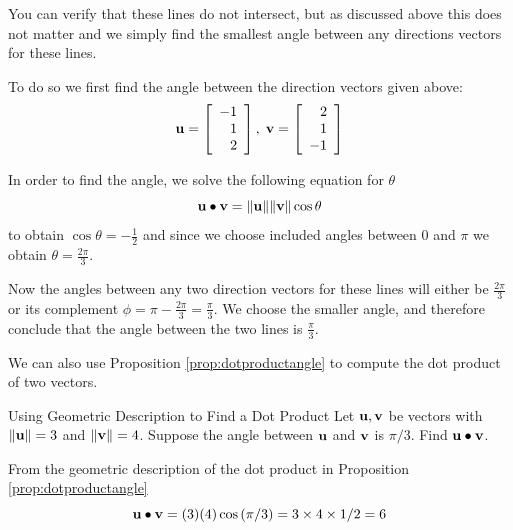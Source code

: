\begin{solution}
You can verify that these lines do not intersect, but as discussed
above this does not matter and we simply find the smallest angle
between any directions vectors for these lines.

To do so  we first find the angle
between the direction vectors given above:
\begin{equation*}
\mathbf{u}=\left[
\begin{array}{r}
-1 \\
1 \\
2
\end{array}
\right],\;
\mathbf{v}=\left[
\begin{array}{r}
2 \\
1 \\
-1
\end{array}
\right]
\end{equation*}

In order to find the angle, we solve the following equation for $\theta$
\begin{equation*}
\mathbf{u}\bullet \mathbf{v}=\| \mathbf{u}\| \| \mathbf{v}
\| \cos \theta
\end{equation*}
to obtain $\cos \theta = -\frac{1}{2}$ and since we choose included
angles between $0$ and $\pi$ we obtain $\theta = \frac{2 \pi}{3}$.

Now the angles between any two direction vectors for these lines will
either be $\frac{2 \pi}{3}$ or its complement $ \phi = \pi -  \frac{2 \pi}{3}
= \frac{\pi}{3}$. We choose the smaller angle, and therefore conclude that the angle between the two lines is $\frac{\pi}{3}$.
\end{solution}

We can also use Proposition \ref{prop:dotproductangle} to compute the dot product of two vectors.

\begin{example}{Using Geometric Description to Find a Dot Product}\label{exa:geometricdotproduct}
Let $\mathbf{u},\mathbf{v}$ be vectors with $ \| \mathbf{u} \| = 3$ and $\| \mathbf{v} \| = 4$. 
Suppose the angle between $\mathbf{u}$ and $\mathbf{v}$ is $\pi / 3$. Find $\mathbf{u}\bullet \mathbf{v}$.
\end{example}

\begin{solution}
From the geometric description of the dot product in Proposition \ref{prop:dotproductangle}
\begin{equation*}
\mathbf{u}\bullet \mathbf{v}=(3)(4) \cos \left( \pi / 3\right) =3\times
4\times 1/2=6
\end{equation*}
\end{solution}

